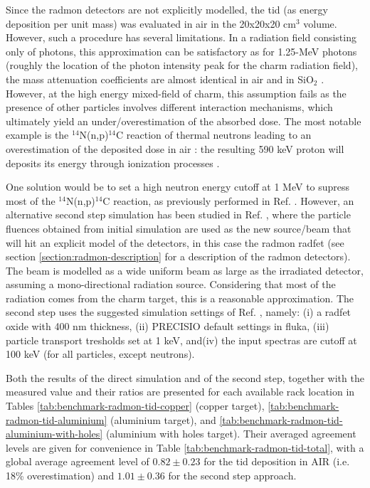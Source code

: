 \documentclass[encoding=utf8,british]{tumphthesis}
\begin{document}
Since the \acrshort{radmon} detectors are not explicitly modelled, the \acrshort{tid} (as energy deposition per unit mass) was evaluated in air in the 20x20x20 cm$^{3}$ volume. However, such a procedure has several limitations. In a radiation field consisting only of photons, this approximation can be satisfactory as for 1.25-MeV photons (roughly the location of the photon intensity peak for the \acrshort{charm} radiation field), the mass attenuation coefficients are almost identical in air and in SiO$_2$ \cite{NIST-Xray-attenuation-coefficients}. However, at the high energy mixed-field of \acrshort{charm}, this assumption fails as the presence of other particles involves different interaction mechanisms, which ultimately yield an under/overestimation of the absorbed dose. The most notable example is the  $^{14}$N(n,p)$^{14}$C reaction of thermal neutrons leading to an overestimation of the deposited dose in air \cite{nitrogen-neutron-gamma-production}: the resulting 590 keV proton will deposits its energy through ionization processes \cite{bougamont:hal-01553919}.

One solution would be to set a high neutron energy cutoff at 1 MeV to supress most of the $^{14}$N(n,p)$^{14}$C reaction, as previously performed in Ref. \cite{Diego:OF}. However, an alternative second step simulation has been studied in Ref. \cite{CHARM:parametric-study}, where the particle fluences obtained from initial simulation are used as the new source/beam that will hit an explicit model of the detectors, in this case the \acrshort{radmon} \acrshort{radfet} (see section \ref{section:radmon-description} for a description of the \acrshort{radmon} detectors). The beam is modelled as a wide uniform beam as large as the irradiated detector, assuming a mono-directional radiation source. Considering that most of the radiation comes from the \acrshort{charm} target, this is a reasonable approximation. The second step uses the suggested simulation settings of Ref. \cite{CHARM:parametric-study}, namely: (i) a \acrshort{radfet} oxide with 400 nm thickness, (ii) PRECISIO default settings in \acrshort{fluka}, (iii) particle transport tresholds set at 1 keV, and(iv) the input spectras are cutoff at 100 keV (for all particles, except neutrons).

Both the results of the direct simulation and of the second step, together with the measured value and their ratios are presented for each available rack location in Tables \ref{tab:benchmark-radmon-tid-copper} (copper target), \ref{tab:benchmark-radmon-tid-aluminium} (aluminium target), and \ref{tab:benchmark-radmon-tid-aluminium-with-holes} (aluminium with holes target). Their averaged agreement levels are given for convenience in Table \ref{tab:benchmark-radmon-tid-total}, with a global average agreement level of $0.82\pm0.23$ for the \acrshort{tid} deposition in AIR (i.e. 18\% overestimation) and $1.01\pm0.36$ for the second step approach.
\end{document}
